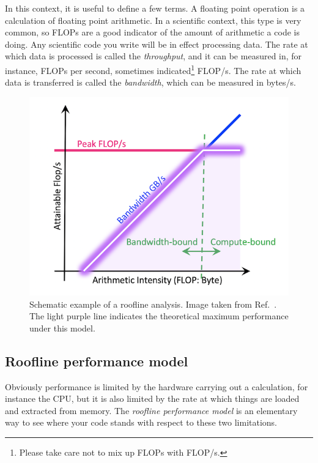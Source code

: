 In this context, it is useful to define a few terms. A floating
point operation is a calculation of floating point arithmetic. In a
scientific context, this type is very common, so FLOPs are a good indicator
of the amount of arithmetic a code is doing. Any scientific code you write will
be in effect processing data. The rate at which data is processed
is called the {\it throughput}, 
and it can be measured in, for instance, FLOPs
per second, sometimes indicated\footnote{Please take care not to
mix up FLOPs with FLOP/s.} FLOP/s. The rate at which data is
transferred is called the {\it bandwidth},
which can be measured in bytes/s.

\begin{figure}[t]
  \centering
  \includegraphics[width=\linewidth]{figs/Roofline-intro.png}
  \caption{Schematic example of a roofline analysis.
           Image taken from Ref.~\cite{roofline}.
           The light purple line indicates the theoretical
           maximum performance under this model.}
  \label{fig:roofline}
\end{figure}


\subsection{Roofline performance model}


Obviously performance is limited by the hardware carrying out a calculation, for
instance the CPU, but it is also limited by the rate at which things are loaded
and extracted from memory. The {\it roofline performance model} is an elementary
way to see where your code stands with respect to these two limitations.

